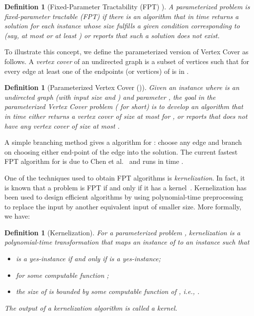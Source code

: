 \documentclass[11pt,letter]{article}
\newtheorem{definition}[theorem]{Definition}
\begin{document}
\begin{definition}[Fixed-Parameter Tractability (FPT) ]
\label{def:fpt}
A parameterized problem  is \emph{fixed-parameter tractable} (FPT) if there is an algorithm
that in time  returns a solution for each instance  whose  size
fulfills a given condition corresponding to  (say, at most   or at least )
or reports that such a solution does not exist.
\end{definition}






To illustrate this concept,
we define the parameterized version of Vertex Cover as follows.
A \textit{vertex cover} of an undirected graph  is a subset 
of vertices such that for every edge  at least one
of the endpoints (or vertices) of  is in .



\begin{definition}[Parameterized Vertex Cover ()]
\label{def:vc}
Given an instance  where  is an undirected graph  (with input size
 and ) and parameter ,  the goal in the
\textit{parameterized Vertex Cover} problem (  for short)
is to develop an algorithm that in time  either returns
a vertex cover of size at most  for , or reports that  does not have
any vertex cover of size at most .
\end{definition}

A simple branching method gives a  algorithm for :
choose any edge and branch on choosing either end-point of the edge into the solution.
The current fastest FPT algorithm for  is due to
Chen et al.~\cite{kanj-vc} and runs in time .






One of the techniques used to obtain FPT algorithms is
\textit{kernelization}. In fact, it is known that a problem is FPT if
and only if it has a kernel~\cite{FG06}.
Kernelization has been used to design efficient algorithms by using polynomial-time
preprocessing to replace the input by another equivalent input of smaller size. More formally, we have:

\begin{definition}[Kernelization]
\label{def:kernel}
For a parameterized problem , kernelization is a polynomial-time transformation
that maps an instance  of  to an instance  such that
\begin{itemize}
\item  is a yes-instance if and only if  is a yes-instance;
\item  for some computable function ;
\item the size of   is bounded by some computable function  of , i.e., .
\end{itemize}
The output  of a kernelization algorithm is called a \textit{kernel}.
\end{definition}
\end{document}
